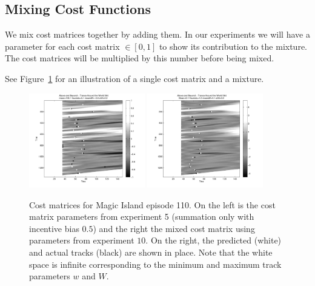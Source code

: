 \documentclass[twocolumn]{article}
\begin{document}
	\subsection{Mixing Cost Functions}
	
	We mix cost matrices together by adding them. In our experiments we will have a parameter for each cost matrix $\in [0,1]$ to show its contribution to the mixture. The cost matrices will be multiplied by this number before being mixed. 
	
	See Figure~\ref{fig:cost_matrices} for an illustration of a single cost matrix and a mixture. 

	\begin{figure}[t]
		\centering
		\includegraphics[width=0.45\textwidth]{images/cm5}
		\includegraphics[width=0.45\textwidth]{images/cm10}
		\caption{Cost matrices for Magic Island episode 110. On the left is the cost matrix parameters from experiment 5 (summation only with incentive bias $0.5$) and the right the mixed cost matrix using parameters from experiment $10$. On the right, the predicted (white) and actual tracks (black) are shown in place. Note that the white space is infinite corresponding to the minimum and maximum track parameters $w$ and $W$.}
		\label{fig:cost_matrices}
	\end{figure} 
	
\end{document}
